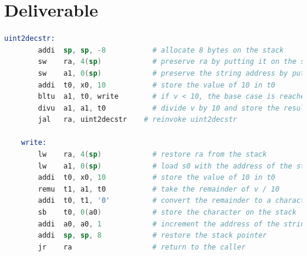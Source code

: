 \documentclass{article}
\begin{document}
\section{Deliverable}
\begin{lstlisting}[language=Assembler,frame=tb]
    uint2decstr:
        addi  sp, sp, -8           # allocate 8 bytes on the stack
        sw    ra, 4(sp)            # preserve ra by putting it on the stack
        sw    a1, 0(sp)            # preserve the string address by putting it on the stack
        addi  t0, x0, 10           # store the value of 10 in t0
        bltu  a1, t0, write        # if v < 10, the base case is reached, so jump to write
        divu  a1, a1, t0           # divide v by 10 and store the result in a1
        jal   ra, uint2decstr    # reinvoke uint2decstr 

    write:
        lw    ra, 4(sp)            # restore ra from the stack
        lw    a1, 0(sp)            # load s0 with the address of the string
        addi  t0, x0, 10           # store the value of 10 in t0
        remu  t1, a1, t0           # take the remainder of v / 10
        addi  t0, t1, '0'          # convert the remainder to a character
        sb    t0, 0(a0)            # store the character on the stack
        addi  a0, a0, 1            # increment the address of the string
        addi  sp, sp, 8            # restore the stack pointer
        jr    ra                   # return to the caller
\end{lstlisting}
\end{document}
